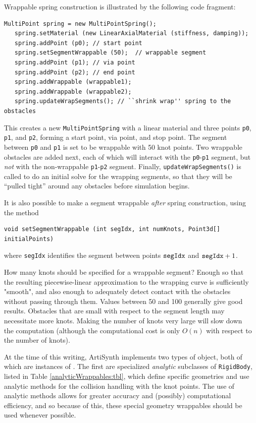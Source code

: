 Wrappable spring construction is illustrated by the following code
fragment:
%
\begin{lstlisting}[]
   MultiPoint spring = new MultiPointSpring();
   spring.setMaterial (new LinearAxialMaterial (stiffness, damping));
   spring.addPoint (p0); // start point
   spring.setSegmentWrappable (50);  // wrappable segment
   spring.addPoint (p1); // via point
   spring.addPoint (p2); // end point
   spring.addWrappable (wrappable1);
   spring.addWrappable (wrappable2);
   spring.updateWrapSegments(); // ``shrink wrap'' spring to the obstacles
\end{lstlisting}
%
This creates a new {\tt MultiPointSpring} with a linear material and
three points {\tt p0}, {\tt p1}, and {\tt p2}, forming a start point,
via point, and stop point.  The segment between {\tt p0} and {\tt p1}
is set to be wrappable with 50 knot points. Two wrappable obstacles
are added next, each of which will interact with the {\tt p0}-{\tt p1}
segment, but {\it not} with the non-wrappable {\tt p1}-{\tt p2}
segment. Finally, {\tt updateWrapSegments()} is called to do an
initial solve for the wrapping segments, so that they will be ``pulled
tight'' around any obstacles before simulation begins.

It is also possible to make a segment wrappable {\it after}
spring construction, using the method
%
\begin{lstlisting}[]
   void setSegmentWrappable (int segIdx, int numKnots, Point3d[] initialPoints)
\end{lstlisting}
%
where {\tt segIdx} identifies the segment between points ${\tt segIdx}$
and ${\tt segIdx}+1$.

How many knots should be specified for a wrappable segment? Enough so
that the resulting piecewise-linear approximation to the wrapping
curve is sufficiently "smooth", and also enough to adequately detect
contact with the obstacles without passing through them. Values
between 50 and 100 generally give good results. Obstacles that are
small with respect to the segment length may necessitate more
knots. Making the number of knots very large will slow down the
computation (although the computational cost is only $O(n)$ with
respect to the number of knots).

At the time of this writing, ArtiSynth implements two types of
 object, both of which are instances of
. The first are specialized {\it analytic}
subclasses of {\tt RigidBody}, listed in Table
\ref{analyticWrappables:tbl}, which define specific geometries and use
analytic methods for the collision handling with the knot points.  The
use of analytic methods allows for greater accuracy and
(possibly) computational efficiency,
and so because of this, these special geometry
wrappables should be used whenever possible.

